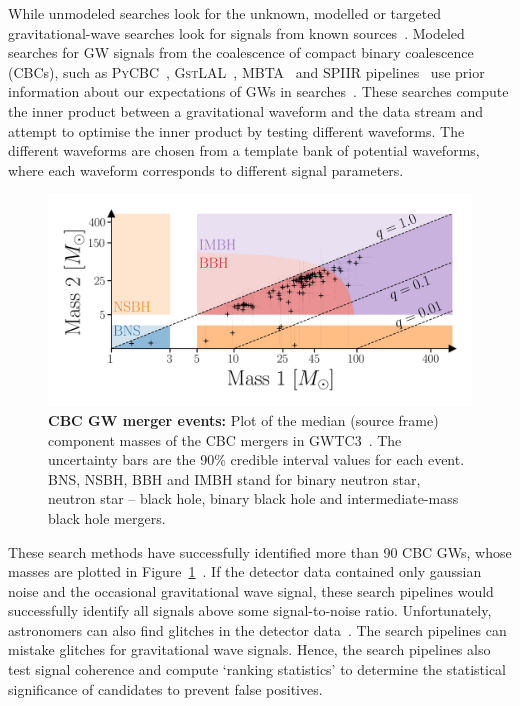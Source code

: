 While unmodeled searches look for the unknown,  modelled or targeted gravitational-wave searches look for signals from known sources~\cite{abbott2016ligo}. 
Modeled searches for GW signals from the coalescence of compact binary coalescence (CBCs), such as \textsc{PyCBC}~\cite{biwer2019pycbc},
\textsc{GstLAL}~\cite{sachdev2019gstlal}, \textsc{MBTA}~\cite{MBTA} and \textsc{SPIIR} pipelines~\cite{SPIIR} use prior information about our expectations of GWs in searches~\cite{gw_search_review}. 
These searches compute the inner product between a gravitational waveform and the data stream and attempt to optimise the inner product by testing different waveforms. 
The different waveforms are chosen from a template bank of potential waveforms, where each waveform corresponds to different signal parameters. 

\begin{figure}
\begin{center}
  \centerline{\includegraphics[width=1.1\linewidth]{src/figures/gw_catalog.png}}
  \caption{\textbf{CBC GW merger events:} Plot of the median (source frame) component masses of the CBC mergers in GWTC3~\cite{gwtc3}. The uncertainty bars are the 90\% credible interval values for each event. BNS, NSBH, BBH and IMBH stand for binary neutron star, neutron star -- black hole, binary black hole and intermediate-mass black hole mergers. }
  \label{fig:cbc_mergers}
\end{center}
\end{figure}

These search methods have successfully identified more than 90 CBC GWs, whose masses are plotted in Figure~\ref{fig:cbc_mergers}~\cite{gwtc3}.
If the detector data contained only gaussian noise and the occasional gravitational wave signal, these search pipelines would successfully identify all signals above some signal-to-noise ratio. 
Unfortunately, astronomers can also find glitches in the detector data~\cite{gw_search_review}. 
The search pipelines can mistake glitches for gravitational wave signals. 
Hence, the search pipelines also test signal coherence and compute `ranking statistics' to determine the statistical significance of candidates to prevent false positives. 

